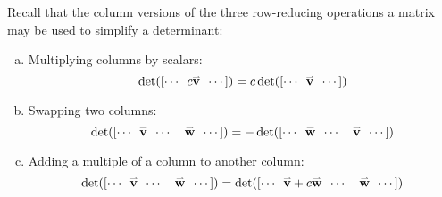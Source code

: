 \begin{remark}
  Recall that the column versions of the three row-reducing operations
  a matrix may be used to simplify a determinant:
  \begin{enumerate}[(a)]
  \item Multiplying columns by scalars:
        \[\det([\cdots\hspace{0.5em}c\vec{v}\hspace{0.5em} \cdots])=
        c\det([\cdots\hspace{0.5em}\vec{v}\hspace{0.5em} \cdots])\]
  \item Swapping two columns:
        \[\det([\cdots\hspace{0.5em}\vec{v}\hspace{0.5em}
        \cdots\hspace{1em}\vec{w}\hspace{0.5em} \cdots])=
        -\det([\cdots\hspace{0.5em}\vec{w}\hspace{0.5em}
        \cdots\hspace{1em}\vec{v}\hspace{0.5em} \cdots])\]
  \item Adding a multiple of a column to another column:
        \[\det([\cdots\hspace{0.5em}\vec{v}\hspace{0.5em}
        \cdots\hspace{1em}\vec{w}\hspace{0.5em} \cdots])=
        \det([\cdots\hspace{0.5em}\vec{v}+c\vec{w}\hspace{0.5em}
        \cdots\hspace{1em}\vec{w}\hspace{0.5em} \cdots])\]
  \end{enumerate}
\end{remark}
